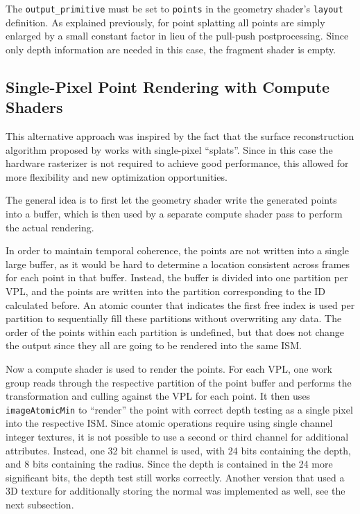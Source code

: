 The \texttt{output\_primitive} must be set to \texttt{points} in the geometry shader's \texttt{layout} definition. As explained previously, for point splatting all points are simply enlarged by a small constant factor in lieu of the pull-push postprocessing. Since only depth information are needed in this case, the fragment shader is empty.



\subsection{Single-Pixel Point Rendering with Compute Shaders}
\label{sec:impl:singlePixelRendering}

This alternative approach was inspired by the fact that the surface reconstruction algorithm proposed by \citet{Marroquim:2007:reconstruction} works with single-pixel ``splats''. Since in this case the hardware rasterizer is not required to achieve good performance, this allowed for more flexibility and new optimization opportunities.

The general idea is to first let the geometry shader write the generated points into a buffer, which is then used by a separate compute shader pass to perform the actual rendering.

In order to maintain temporal coherence, the points are not written into a single large buffer, as it would be hard to determine a location consistent across frames for each point in that buffer. Instead, the buffer is divided into one partition per VPL, and the points are written into the partition corresponding to the ID calculated before. An atomic counter that indicates the first free index is used per partition to sequentially fill these partitions without overwriting any data. The order of the points within each partition is undefined, but that does not change the output since they all are going to be rendered into the same ISM.

Now a compute shader is used to render the points. For each VPL, one work group reads through the respective partition of the point buffer and performs the transformation and culling against the VPL for each point. It then uses \texttt{imageAtomicMin} to ``render'' the point with correct depth testing as a single pixel into the respective ISM. Since atomic operations require using single channel integer textures, it is not possible to use a second or third channel for additional attributes. Instead, one 32 bit channel is used, with 24 bits containing the depth, and 8 bits containing the radius. Since the depth is contained in the 24 more significant bits, the depth test still works correctly. Another version that used a 3D texture for additionally storing the normal was implemented as well, see the next subsection.


